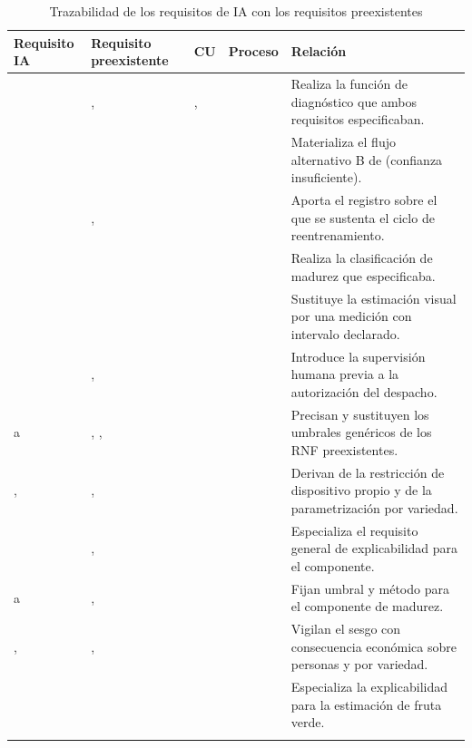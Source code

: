 \begin{longtable}{|C{1.9cm}|C{2.2cm}|C{1.5cm}|C{1.5cm}|L{6.4cm}|}
\hline
{}\textbf{Requisito IA} & \textbf{Requisito preexistente} & \textbf{CU} & \textbf{Proceso} & \textbf{Relación}\\ \hline
\endhead
{} & ,  & ,  &  & Realiza la función de diagnóstico que ambos requisitos especificaban.\\ \hline
{} &  &  &  & Materializa el flujo alternativo B de  (confianza insuficiente).\\ \hline
{} & ,  &  &  & Aporta el registro sobre el que se sustenta el ciclo de reentrenamiento.\\ \hline
{} &  &  &  & Realiza la clasificación de madurez que  especificaba.\\ \hline
{} &  &  &  & Sustituye la estimación visual por una medición con intervalo declarado.\\ \hline
{} & ,  &  &  & Introduce la supervisión humana previa a la autorización del despacho.\\ \hline
{} a  & , ,  &  &  & Precisan y sustituyen los umbrales genéricos de los RNF preexistentes.\\ \hline
{},  & ,  &  &  & Derivan de la restricción de dispositivo propio y de la parametrización por variedad.\\ \hline
{} & ,  &  &  & Especializa el requisito general de explicabilidad para el componente.\\ \hline
{} a  & ,  &  &  & Fijan umbral y método para el componente de madurez.\\ \hline
{},  & ,  &  &  & Vigilan el sesgo con consecuencia económica sobre personas y por variedad.\\ \hline
{} &  &  &  & Especializa la explicabilidad para la estimación de fruta verde.\\ \hline
\caption{Trazabilidad de los requisitos de IA con los requisitos preexistentes}
\label{tab:traza-ia-inf}
\end{longtable}

